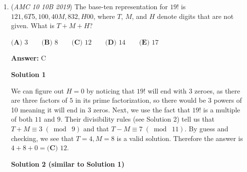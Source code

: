 \begin{enumerate}
 \textbf{Answer: }A



\textbf{Solution}

The mean is $\frac{4+6+8+17+x}{5}=\frac{35+x}{5}$.

 There are three possibilities for the median: it is either $6$, $8$, or $x$.

 Let's start with $6$.

 $\frac{35+x}{5}=6$ has solution $x=-5$, and the sequence is $-5, 4, 6, 8, 17$, which does have median $6$, so this is a valid solution.

 Now let the median be $8$.

 $\frac{35+x}{5}=8$ gives $x=5$, so the sequence is $4, 5, 6, 8, 17$, which has median $6$, so this is not valid.

 Finally we let the median be $x$.

 $\frac{35+x}{5}=x \implies 35+x=5x \implies x=\frac{35}{4}=8.75$, and the sequence is $4, 6, 8, 8.75, 17$, which has median $8$. This case is therefore again not valid.

 Hence the only possible value of $x$ is $\boxed{\textbf{(A) }-5}.$



	\item (\textit{AMC 10 10B 2019}) The base-ten representation for $19!$ is $121,6T5,100,40M,832,H00$, where $T$, $M$, and $H$ denote digits that are not given. What is $T+M+H$?


 $\textbf{(A) }3 \qquad\textbf{(B) }8 \qquad\textbf{(C) }12 \qquad\textbf{(D) }14 \qquad\textbf{(E) } 17$

 \textbf{Answer: }C



\textbf{Solution 1}

We can figure out $H = 0$ by noticing that $19!$ will end with $3$ zeroes, as there are three factors of $5$ in its prime factorization, so there would be 3 powers of 10 meaning it will end in 3 zeros. Next, we use the fact that $19!$ is a multiple of both $11$ and $9$. Their divisibility rules (see Solution 2) tell us that $T + M \equiv 3 \;(\bmod\; 9)$ and that $T - M \equiv 7 \;(\bmod\; 11)$. By guess and checking, we see that $T = 4, M = 8$ is a valid solution. Therefore the answer is $4 + 8 + 0 = \boxed{\textbf{(C) }12}$.

 



\textbf{Solution 2 (similar to Solution 1)}


\end{enumerate}
